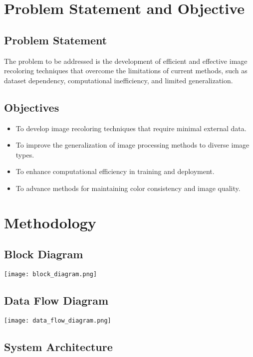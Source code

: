 \documentclass{article}
\begin{document}
\section{Problem Statement and Objective}

\subsection{Problem Statement}

The problem to be addressed is the development of efficient and effective image recoloring techniques that overcome the limitations of current methods, such as dataset dependency, computational inefficiency, and limited generalization.

\subsection{Objectives}

\begin{itemize}
    \item To develop image recoloring techniques that require minimal external data.
    \item To improve the generalization of image processing methods to diverse image types.
    \item To enhance computational efficiency in training and deployment.
    \item To advance methods for maintaining color consistency and image quality.
\end{itemize}

\section{Methodology}

\subsection{Block Diagram}

\texttt{[image: block\_diagram.png]} %

\subsection{Data Flow Diagram}

\texttt{[image: data\_flow\_diagram.png]} %

\subsection{System Architecture}
\end{document}
